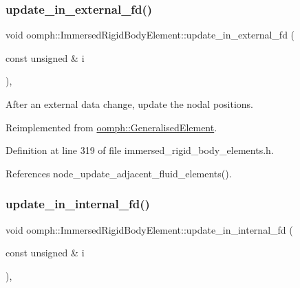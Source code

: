 \mbox{\label{classoomph_1_1ImmersedRigidBodyElement_a54a7da8fcacfc00c29c36561170ad3c6}} 
\subsubsection{\texorpdfstring{update\+\_\+in\+\_\+external\+\_\+fd()}{update\_in\_external\_fd()}}
{\footnotesize\ttfamily void oomph\+::\+Immersed\+Rigid\+Body\+Element\+::update\+\_\+in\+\_\+external\+\_\+fd (\begin{DoxyParamCaption}\item[{const unsigned \&}]{i }\end{DoxyParamCaption})\hspace{0.3cm}{\ttfamily [inline]}, {\ttfamily [virtual]}}



After an external data change, update the nodal positions. 



Reimplemented from \hyperlink{classoomph_1_1GeneralisedElement_af740b8c507dde03700cff5d196e28019}{oomph\+::\+Generalised\+Element}.



Definition at line 319 of file immersed\+\_\+rigid\+\_\+body\+\_\+elements.\+h.



References node\+\_\+update\+\_\+adjacent\+\_\+fluid\+\_\+elements().

\mbox{\label{classoomph_1_1ImmersedRigidBodyElement_a96a991a1b99ff591bebe076772fc99c3}} 
\subsubsection{\texorpdfstring{update\+\_\+in\+\_\+internal\+\_\+fd()}{update\_in\_internal\_fd()}}
{\footnotesize\ttfamily void oomph\+::\+Immersed\+Rigid\+Body\+Element\+::update\+\_\+in\+\_\+internal\+\_\+fd (\begin{DoxyParamCaption}\item[{const unsigned \&}]{i }\end{DoxyParamCaption})\hspace{0.3cm}{\ttfamily [inline]}, {\ttfamily [virtual]}}




